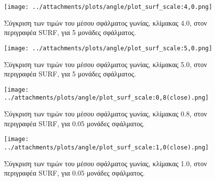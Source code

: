  \newpage
 
 \begin{figure}[ht!]
\begin{minipage}[b]{1.0\linewidth}
\centering
\texttt{[image: ../attachments/plots/angle/plot\_surf\_scale:4,0.png]}
\caption{Σύγκριση των τιμών του μέσου σφάλματος γωνίας, κλίμακας 4.0, στον περιγραφέα SURF, για 5 μονάδες σφάλματος.}
\label{figure:plot_scale_surf_high_4.0}
\end{minipage}
\end{figure} 
\begin{figure}[ht!]
\begin{minipage}[b]{1.0\linewidth}
\centering
\texttt{[image: ../attachments/plots/angle/plot\_surf\_scale:5,0.png]}
\caption{Σύγκριση των τιμών του μέσου σφάλματος γωνίας, κλίμακας 5.0, στον περιγραφέα SURF, για 5 μονάδες σφάλματος.}
\label{figure:plot_scale_surf_high_5.0}
\end{minipage}

 \end{figure} 
 
 \newpage
   

 \begin{figure}[ht!]
\begin{minipage}[b]{1.0\linewidth}
\centering
\texttt{[image: ../attachments/plots/angle/plot\_surf\_scale:0,8(close).png]}
\caption{Σύγκριση των τιμών του μέσου σφάλματος γωνίας, κλίμακας 0.8, στον περιγραφέα SURF, για 0.05 μονάδες σφάλματος.}
\label{figure:plot_scale_surf_low_0.8}
\end{minipage}
\end{figure} 
\begin{figure}[ht!]
\begin{minipage}[b]{1.0\linewidth}
\centering
\texttt{[image: ../attachments/plots/angle/plot\_surf\_scale:1,0(close).png]}
\caption{Σύγκριση των τιμών του μέσου σφάλματος γωνίας, κλίμακας 1.0, στον περιγραφέα SURF, για 0.05 μονάδες σφάλματος.}
\label{figure:plot_scale_surf_low_1.0}
\end{minipage}

 \end{figure} 
 
 
 
\newpage
 

